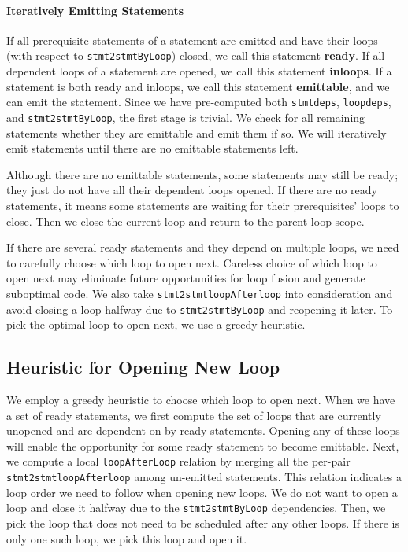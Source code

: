 \documentclass[sigplan, nonacm]{acmart}\settopmatter{printfolios=true,printccs=false,printacmref=false}
\begin{document}
\paragraph*{Iteratively Emitting Statements} If all prerequisite statements of a statement are emitted and have their loops (with respect to \texttt{stmt2stmtByLoop}) closed, we call this statement \textbf{ready}. If all dependent loops of a statement are opened, we call this statement \textbf{inloops}. If a statement is both ready and inloops, we call this statement \textbf{emittable}, and we can emit the statement. Since we have pre-computed both \texttt{stmtdeps}, \texttt{loopdeps}, and \texttt{stmt2stmtByLoop}, the first stage is trivial. We check for all remaining statements whether they are emittable and emit them if so. We will iteratively emit statements until there are no emittable statements left.\par

Although there are no emittable statements, some statements may still be ready; they just do not have all their dependent loops opened. If there are no ready statements, it means some statements are waiting for their prerequisites' loops to close. Then we close the current loop and return to the parent loop scope.\par

If there are several ready statements and they depend on multiple loops, we need to carefully choose which loop to open next. Careless choice of which loop to open next may eliminate future opportunities for loop fusion and generate suboptimal code. We also take \texttt{stmt2stmtloopAfterloop} into consideration and avoid closing a loop halfway due to \texttt{stmt2stmtByLoop} and reopening it later. To pick the optimal loop to open next, we use a greedy heuristic.\par

\subsection*{Heuristic for Opening New Loop}
We employ a greedy heuristic to choose which loop to open next. When we have a set of ready statements, we first compute the set of loops that are currently unopened and are dependent on by ready statements. Opening any of these loops will enable the opportunity for some ready statement to become emittable. Next, we compute a local \texttt{loopAfterLoop} relation by merging all the per-pair \texttt{stmt2stmtloopAfterloop} among un-emitted statements. This relation indicates a loop order we need to follow when opening new loops. We do not want to open a loop and close it halfway due to the \texttt{stmt2stmtByLoop} dependencies. Then, we pick the loop that does not need to be scheduled after any other loops. If there is only one such loop, we pick this loop and open it.\par
\end{document}
